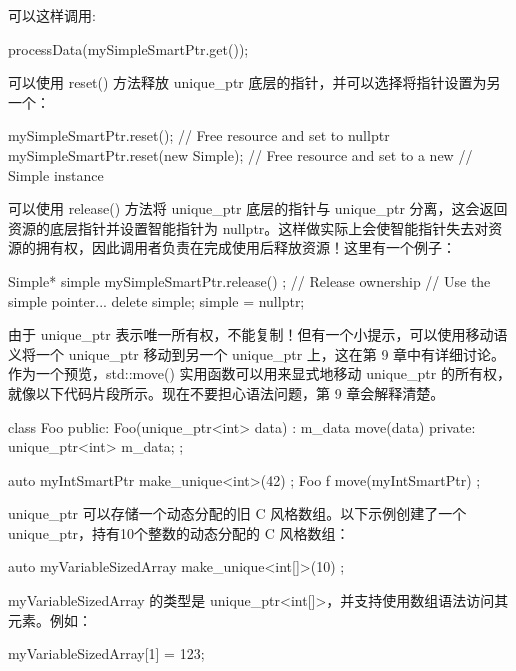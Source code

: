 可以这样调用:

\begin{cpp}
processData(mySimpleSmartPtr.get());
\end{cpp}

可以使用 reset() 方法释放 unique\_ptr 底层的指针，并可以选择将指针设置为另一个：

\begin{cpp}
mySimpleSmartPtr.reset(); // Free resource and set to nullptr
mySimpleSmartPtr.reset(new Simple{}); // Free resource and set to a new
// Simple instance
\end{cpp}

可以使用 release() 方法将 unique\_ptr 底层的指针与 unique\_ptr 分离，这会返回资源的底层指针并设置智能指针为 nullptr。这样做实际上会使智能指针失去对资源的拥有权，因此调用者负责在完成使用后释放资源！这里有一个例子：

\begin{cpp}
Simple* simple { mySimpleSmartPtr.release() }; // Release ownership
// Use the simple pointer...
delete simple;
simple = nullptr;
\end{cpp}

由于 unique\_ptr 表示唯一所有权，不能复制！但有一个小提示，可以使用移动语义将一个 unique\_ptr 移动到另一个 unique\_ptr 上，这在第 9 章中有详细讨论。作为一个预览，std::move() 实用函数可以用来显式地移动 unique\_ptr 的所有权，就像以下代码片段所示。现在不要担心语法问题，第 9 章会解释清楚。

\begin{cpp}
class Foo
{
    public:
    Foo(unique_ptr<int> data) : m_data { move(data) } { }
    private:
    unique_ptr<int> m_data;
};

auto myIntSmartPtr { make_unique<int>(42) };
Foo f { move(myIntSmartPtr) };
\end{cpp}


unique\_ptr 可以存储一个动态分配的旧 C 风格数组。以下示例创建了一个 unique\_ptr，持有10个整数的动态分配的 C 风格数组：

\begin{cpp}
auto myVariableSizedArray { make_unique<int[]>(10) };
\end{cpp}

myVariableSizedArray 的类型是 unique\_ptr<int[]>，并支持使用数组语法访问其元素。例如：

\begin{cpp}
myVariableSizedArray[1] = 123;
\end{cpp}


